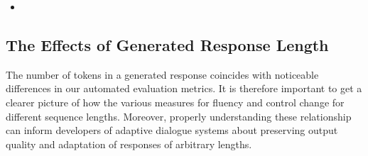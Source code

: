 \begin{itemize}
    \item {}
\end{itemize}


\subsection{The Effects of Generated Response Length }
\label{subsec:ctg_anal_response_length}

The number of tokens in a generated response coincides with noticeable differences in our automated evaluation metrics. It is therefore important to get a clearer picture of how the various measures for fluency and control change for different sequence lengths. Moreover, properly understanding these relationship can inform developers of adaptive dialogue systems about preserving output quality and adaptation of responses of arbitrary lengths.

